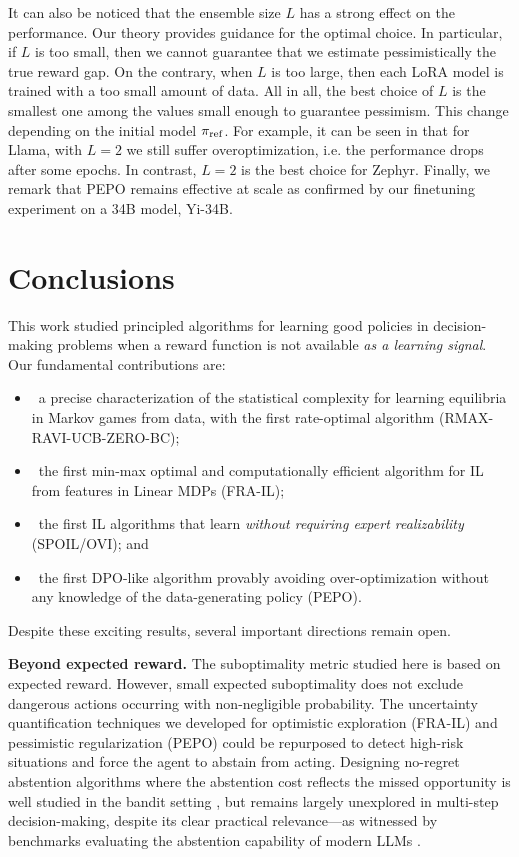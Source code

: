 \documentclass{article}
\begin{document}
It can also be noticed that the ensemble size $L$ has a strong effect on the performance. Our theory provides 
guidance for the optimal choice. In particular, if $L$ is too small, then we cannot guarantee
that we estimate pessimistically the true reward gap.
On the contrary, when $L$ is too large, then each LoRA model is trained with a too small amount of data. All in all, the best choice of $L$ is the 
smallest one among the values small enough to guarantee pessimism. This change depending on the initial model $\pi_{\mathrm{ref}}$. 
For example, it can be seen in  that for Llama, with $L=2$ we still suffer overoptimization, i.e. the performance drops after some epochs.
In contrast, $L=2$ is the best choice for Zephyr.
Finally, we remark that PEPO remains effective at scale as confirmed by our finetuning 
experiment on a 34B model, Yi-34B.

\section{Conclusions}

This work studied principled algorithms for learning good policies in decision-making problems when a reward function is not available \emph{as a learning signal}. Our fundamental contributions are: 

\begin{itemize}
\item~a precise characterization of the statistical complexity for learning equilibria in Markov games from data, with the first rate-optimal algorithm (RMAX-RAVI-UCB-ZERO-BC); 
\item~the first min-max optimal and computationally efficient algorithm for IL from features in Linear MDPs (FRA-IL); 
\item~the first IL algorithms that learn \emph{without requiring expert realizability} (SPOIL/OVI); and 
\item~the first DPO-like algorithm provably avoiding over-optimization without any knowledge of the data-generating policy (PEPO).
\end{itemize}
Despite these exciting results, several important directions remain open.

\textbf{Beyond expected reward.}
The suboptimality metric studied here is based on expected reward. However, small expected suboptimality does not exclude dangerous actions occurring with non-negligible probability. The uncertainty quantification techniques we developed for optimistic exploration (FRA-IL) and pessimistic regularization (PEPO) could be repurposed to detect high-risk situations and force the agent to abstain from acting. Designing no-regret abstention algorithms where the abstention cost reflects the missed opportunity is well studied in the bandit setting \citep{cortes2018online,neu2020fast,pasteris2024bandits}, but remains largely unexplored in multi-step decision-making, despite its clear practical relevance---as witnessed by benchmarks evaluating the abstention capability of modern LLMs \citep{fan2026halluhard}.
\end{document}
